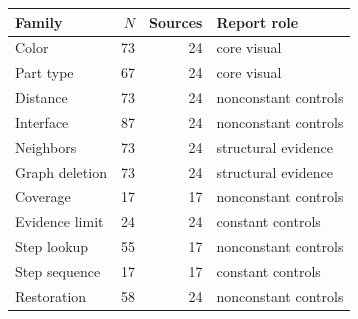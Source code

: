 \begin{tabularx}{\linewidth}{XrrX}
\toprule
Family & $N$ & Sources & Report role\\\midrule
Color & 73 & 24 & core visual\\
Part type & 67 & 24 & core visual\\
Distance & 73 & 24 & nonconstant controls\\
Interface & 87 & 24 & nonconstant controls\\
Neighbors & 73 & 24 & structural evidence\\
Graph deletion & 73 & 24 & structural evidence\\
Coverage & 17 & 17 & nonconstant controls\\
Evidence limit & 24 & 24 & constant controls\\
Step lookup & 55 & 17 & nonconstant controls\\
Step sequence & 17 & 17 & constant controls\\
Restoration & 58 & 24 & nonconstant controls\\
\bottomrule
\end{tabularx}
